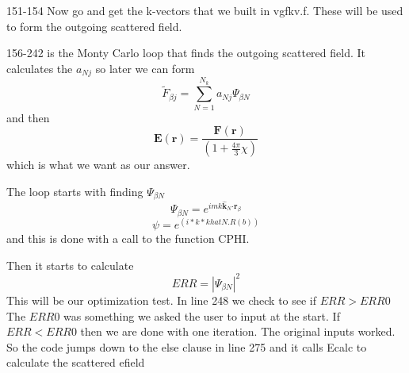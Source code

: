 \documentclass{article}
\begin{document}
151-154 Now go and get the k-vectors that we built in vgfkv.f. These will be
used to form the outgoing scattered field.

156-242 is the Monty Carlo loop that finds the outgoing scattered field. It
calculates the $a_{Nj}$ so later we can form 
\[
\tilde{F}_{\beta j}\mathbf{=}\sum_{N=1}^{N_{k}}a_{Nj}\Psi _{\beta N}
\]%
and then 
\[
\mathbf{E}(\mathbf{r})=\frac{\mathbf{F}(\mathbf{r})}{(1+\frac{4\pi }{3}\chi )%
}
\]%
which is what we want as our answer.

The loop starts with finding $\Psi _{\beta N}$%
\[
\Psi _{\beta N}=e^{imk\mathbf{\hat{k}}_{N}\mathbf{\cdot r}_{\beta }} 
\]%
\[
\psi =e^{(i\ast k\ast khatN.R(b))} 
\]%
and this is done with a call to the function CPHI.

Then it starts to calculate 
\[
ERR=\left\vert \Psi _{\beta N}\right\vert ^{2}
\]%
This will be our optimization test. In line 248 we check to see if $ERR>ERR0$
The $ERR0$ was something we asked the user to input at the start. If $%
ERR<ERR0$ then we are done with one iteration. The original inputs worked.
So the code jumps down to the else clause in line 275 and it calls Ecalc to
calculate the scattered efield
\end{document}
